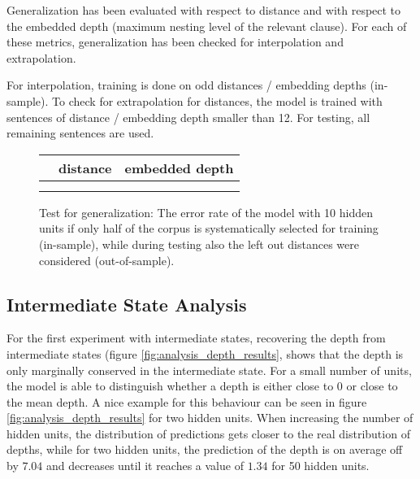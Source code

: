 \documentclass[11pt,a4paper]{article}
\newlength\figureheight
\newlength\figurewidth
\begin{document}
Generalization has been evaluated with respect to distance and with respect to the embedded depth (maximum nesting level of the relevant clause). For each of these metrics, generalization has been checked for interpolation and extrapolation.

For interpolation, training is done on odd distances / embedding depths (in-sample). To check for extrapolation for distances, the model is trained with sentences of distance / embedding depth smaller than 12. For testing, all remaining sentences are used.

\setlength\figureheight{4cm}
\setlength{}
\begin{figure*}[ht]
    \bgroup
    \def\arraystretch{1.5}%
    \begin{tabular}{c|c c}
        & distance & embedded depth\\
        \hline
        \raisebox{0.45in}{\rotatebox{90}{interpolation}} &
         & \\
        \raisebox{0.45in}{\rotatebox{90}{extrapolation}} &  &
        
    \end{tabular}
    \egroup
    \caption{Test for generalization: The error rate of the model with 10 hidden units if only half of the corpus is systematically selected for training (in-sample), while during testing also the left out distances were considered (out-of-sample).}%
    \label{fig:generalization_results}%
\end{figure*}

\subsection{Intermediate State Analysis}
\label{subsec:intermediate_state_analysis}

For the first experiment with intermediate states, recovering the depth from intermediate states (figure \ref{fig:analysis_depth_results}, shows that the depth is only marginally conserved in the intermediate state. For a small number of units, the model is able to distinguish whether a depth is either close to $0$ or close to the mean depth. A nice example for this behaviour can be seen in figure \ref{fig:analysis_depth_results} for two hidden units. When increasing the number of hidden units, the distribution of predictions gets closer to the real distribution of depths, while for two hidden units, the prediction of the depth is on average off by $7.04$ and decreases until it reaches a value of $1.34$ for 50 hidden units.
\end{document}
